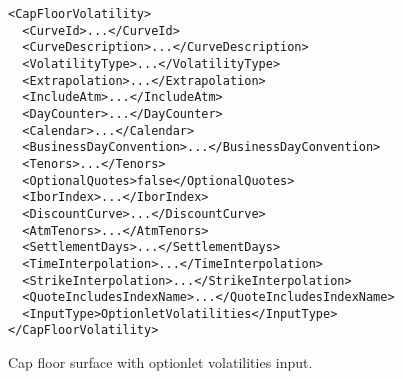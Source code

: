 \begin{longlisting}
\begin{verbatim}
<CapFloorVolatility>
  <CurveId>...</CurveId>
  <CurveDescription>...</CurveDescription>
  <VolatilityType>...</VolatilityType>
  <Extrapolation>...</Extrapolation>
  <IncludeAtm>...</IncludeAtm>
  <DayCounter>...</DayCounter>
  <Calendar>...</Calendar>
  <BusinessDayConvention>...</BusinessDayConvention>
  <Tenors>...</Tenors>
  <OptionalQuotes>false</OptionalQuotes>
  <IborIndex>...</IborIndex>
  <DiscountCurve>...</DiscountCurve>
  <AtmTenors>...</AtmTenors>
  <SettlementDays>...</SettlementDays>
  <TimeInterpolation>...</TimeInterpolation>
  <StrikeInterpolation>...</StrikeInterpolation>
  <QuoteIncludesIndexName>...</QuoteIncludesIndexName>
  <InputType>OptionletVolatilities</InputType>
</CapFloorVolatility>
\end{verbatim}
\caption{Cap floor surface with optionlet volatilities input.}
\label{lst:capfloorvol_optionlet_surface_configuration}
\end{longlisting}
